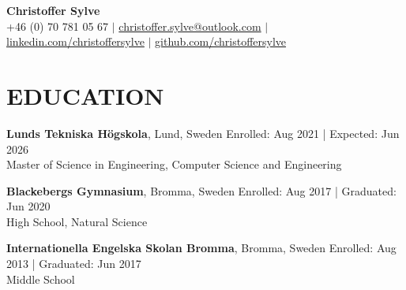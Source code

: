 \documentclass[a4paper,9pt]{extarticle}
\begin{document}
\pagestyle{empty}

\begin{center}
{\textbf{\fontsize{22}{20}\selectfont Christoffer Sylve}}\\[5pt] %
+46 (0) 70 781 05 67 $\vert$ 
\href{mailto:christoffer.sylve@outlook.com}{christoffer.sylve@outlook.com} $\vert$
\href{https://www.linkedin.com/in/christoffer-sylve/}{linkedin.com/christoffersylve} $\vert$
\href{https://github.com/christoffersylve}{github.com/christoffersylve} 
\end{center}




\section*{EDUCATION}
\noindent
\textbf{Lunds Tekniska Högskola}, Lund, Sweden \hfill Enrolled: Aug 2021 | Expected: Jun 2026\\ %
Master of Science in Engineering, Computer Science and Engineering

\vspace{5pt}
\noindent
\textbf{Blackebergs Gymnasium}, Bromma, Sweden  \hfill Enrolled: Aug 2017 | Graduated: Jun 2020\\ %
High School, Natural Science 

\vspace{5pt}
\noindent
\textbf{Internationella Engelska Skolan Bromma}, Bromma, Sweden  \hfill Enrolled: Aug 2013 | Graduated: Jun 2017\\ %
Middle School 



\end{document}
